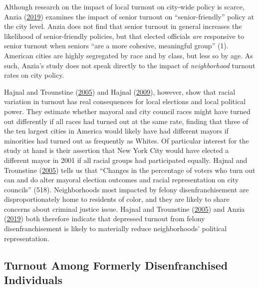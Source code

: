 \documentclass[12pt,]{article}
\begin{document}
Although research on the impact of local turnout on city-wide policy is scarce, Anzia (\protect\hyperlink{ref-Anzia2019}{2019}) examines the impact of senior turnout on ``senior-friendly'' policy at the city level. Anzia does not find that senior turnout in general increases the likelihood of senior-friendly policies, but that elected officials \emph{are} responsive to senior turnout when seniors ``are a more cohesive, meaningful group'' (1). American cities are highly segregated by race and by class, but less so by age. As such, Anzia's study does not speak directly to the impact of \emph{neighborhood} turnout rates on city policy.

Hajnal and Trounstine (\protect\hyperlink{ref-Hajnal2005}{2005}) and Hajnal (\protect\hyperlink{ref-Hajnal2009}{2009}), however, show that racial variation in turnout has real consequences for local elections and local political power. They estimate whether mayoral and city council races might have turned out differently if all races had turned out at the same rate, finding that three of the ten largest cities in America would likely have had different mayors if minorities had turned out as frequently as Whites. Of particular interest for the study at hand is their assertion that New York City would have elected a different mayor in 2001 if all racial groups had participated equally. Hajnal and Trounstine (\protect\hyperlink{ref-Hajnal2005}{2005}) tells us that ``Changes in the percentage of voters who turn out can and do alter mayoral election outcomes and racial representation on city councils'' (518). Neighborhoods most impacted by felony disenfranchisement are disproportionately home to residents of color, and they are likely to share concerns about criminal justice issue. Hajnal and Trounstine (\protect\hyperlink{ref-Hajnal2005}{2005}) and Anzia (\protect\hyperlink{ref-Anzia2019}{2019}) both therefore indicate that depressed turnout from felony disenfranchisement is likely to materially reduce neighborhoods' political representation.

\hypertarget{turnout-among-formerly-disenfranchised-individuals}{%
\subsection*{Turnout Among Formerly Disenfranchised Individuals}\label{turnout-among-formerly-disenfranchised-individuals}}
\end{document}
